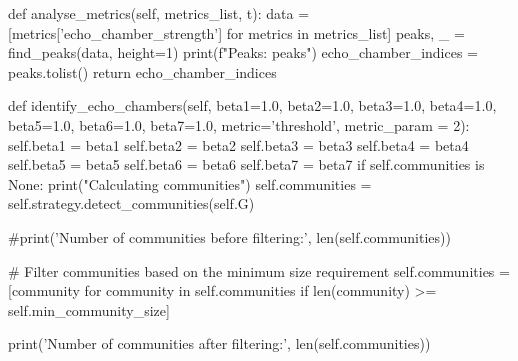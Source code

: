 \begin{codigo}[caption={Exemplo de classe Python para deteção de câmaras de eco}, label={codigo:echochamberdetector}, language=Python, breaklines=true]
    def analyse_metrics(self, metrics_list, t):
        data = [metrics['echo_chamber_strength'] for metrics in metrics_list]
        peaks, _ = find_peaks(data, height=1)
        print(f"Peaks: {peaks}")
        echo_chamber_indices = peaks.tolist()
        return echo_chamber_indices

    def identify_echo_chambers(self, beta1=1.0, beta2=1.0, beta3=1.0, beta4=1.0, beta5=1.0, beta6=1.0, beta7=1.0, metric='threshold', metric_param = 2):
        self.beta1 = beta1
        self.beta2 = beta2
        self.beta3 = beta3
        self.beta4 = beta4
        self.beta5 = beta5
        self.beta6 = beta6
        self.beta7 = beta7
        if self.communities is None:
          print("Calculating communities")
          self.communities = self.strategy.detect_communities(self.G)

        #print('Number of communities before filtering:', len(self.communities))

        # Filter communities based on the minimum size requirement
        self.communities = [community for community in self.communities if len(community) >= self.min_community_size]

        print('Number of communities after filtering:', len(self.communities))


\end{codigo}

